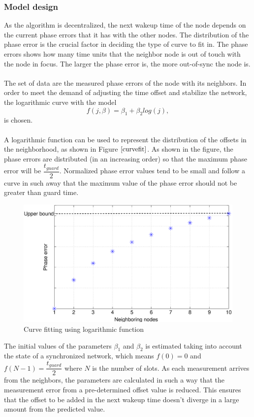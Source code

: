 \documentclass[a4paper,10pt]{report}
\begin{document}
\subsubsection{Model design}
As the algorithm is decentralized, the next wakeup time of the node
depends on the current phase errors that it has with the other
nodes. The distribution of the phase error is the crucial factor in
deciding the type of curve to fit in. The phase errors shows how
many time units that the neighbor node is out of touch with the node
in focus. The larger the phase error is, the more out-of-sync the
node is.\paragraph*{} The set of data are the measured phase errors
of the node with its neighbors. In order to meet the demand of
adjusting the time offset and stabilize the network, the logarithmic
curve with the model
\begin{equation}
 f(j,\beta)= \beta _1 + \beta_2log(j),
\end{equation}
is chosen. \paragraph*{} A logarithmic function can be used to
represent the distribution of the offsets in the neighborhood, as
shown in Figure $\ref{curvefit}$. As shown in the figure, the phase
errors are distributed (in an increasing order) so that the maximum
phase error will be $\dfrac{t_{guard}}{2}$. Normalized phase error
values tend to be small and follow a curve in such away that the
maximum value of the phase error should not be greater than guard
time.
\begin{figure}
\centering
\includegraphics[width= 0.6 \textwidth]{curvefit}
\caption{Curve fitting using logarithmic function} \label{curvefit}
\end{figure}
\newline
The initial values of the parameters $\beta_1$ and $\beta_2$ is
estimated taking into account the state of a synchronized network,
which means $f(0)=0$ and $f(N-1)=\dfrac{t_{guard}}{2}$ where $N$ is
the number of slots. As each measurement arrives from the
neighbors, the parameters are calculated in such a way that the
measurement error from a pre-determined offset value is reduced.
This ensures that the offset to be added in the next wakeup time
doesn't diverge in a large amount from the predicted value.
\end{document}
